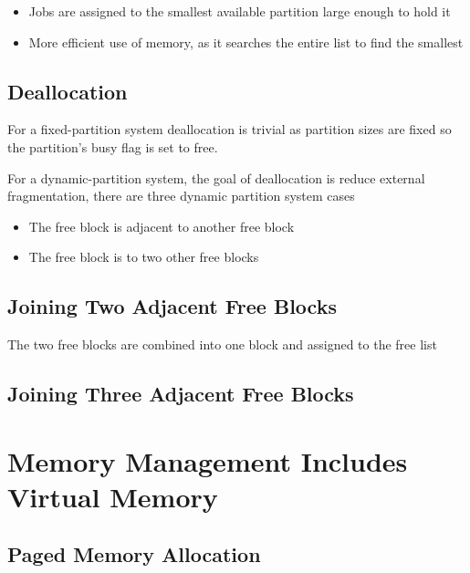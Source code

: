 \documentclass[12pt letter]{report}
\begin{document}
\begin{itemize}
  \item Jobs are assigned to the smallest available partition large enough to hold it
  \item More efficient use of memory, as it searches the entire list to find the smallest
\end{itemize}

\section{Deallocation}



For a fixed-partition system deallocation is trivial as partition sizes are fixed so the partition's busy flag is set to free.

For a dynamic-partition system, the goal of deallocation is reduce external fragmentation, there are three dynamic partition system cases
\begin{itemize}
  \item The free block is adjacent to another free block
  \item The free block is to two other free blocks
\end{itemize}

\section{Joining Two Adjacent Free Blocks}

The two free blocks are combined into one block and assigned to the free list

\section{Joining Three Adjacent Free Blocks}

\chapter{Memory Management Includes Virtual Memory}

\section{Paged Memory Allocation}

\end{document}
